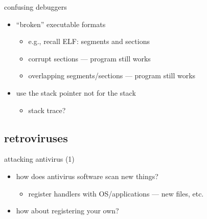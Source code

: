 \begin{frame}{confusing debuggers}
    \begin{itemize}
    \item ``broken'' executable formats
        \begin{itemize}
        \item e.g., recall ELF: segments and sections
        \item corrupt sections --- program still works
        \item overlapping segments/sections --- program still works
        \end{itemize}
    \item use the stack pointer not for the stack
        \begin{itemize}
        \item stack trace?
        \end{itemize}
    \end{itemize}
\end{frame}

\subsection{retroviruses}


\begin{frame}{attacking antivirus (1)}
    \begin{itemize}
    \item how does antivirus software scan new things?
        \begin{itemize}
        \item register handlers with OS/applications --- new files, etc.
        \end{itemize}
    \item how about registering your own?
    \end{itemize}
\end{frame}

